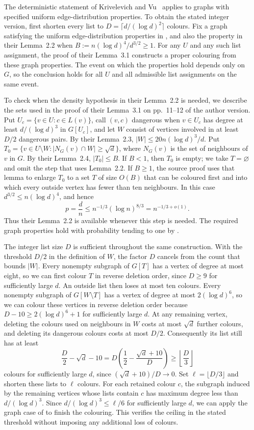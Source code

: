 \documentclass[11pt]{article}
\numberwithin{equation}{section}
\begin{document}
  
The deterministic statement of Krivelevich and Vu~\cite[Lemma~3.1]{KV} applies to graphs with specified uniform edge-distribution properties. To obtain the stated integer version, first shorten every list to $D=\lceil d/(\log d)^2\rceil$ colours. Fix a graph satisfying the uniform edge-distribution properties in \cite[Lemmas~2.1, 2.3 and~2.4]{KV}, and also the property in their Lemma~2.2 when $B:=n(\log d)^4/d^{3/2}\ge1$. For any $U$ and any such list assignment, the proof of their Lemma~3.1 constructs a proper colouring from these graph properties. The event on which the properties hold depends only on $G$, so the conclusion holds for all $U$ and all admissible list assignments on the same event.

To check when the density hypothesis in their Lemma~2.2 is needed, we describe the sets used in the proof of their Lemma~3.1 on pp.~11--12 of the author version. Put $U_c=\{v\in U:c\in L(v)\}$, call $(v,c)$ dangerous when $v\in U_c$ has degree at least $d/(\log d)^3$ in $G[U_c]$, and let $W$ consist of vertices involved in at least $D/2$ dangerous pairs. By their Lemma~2.3, $|W|\le20n(\log d)^3/d$. Put $T_0=\{v\in U\setminus W:|N_G(v)\cap W|\ge\sqrt d\}$, where $N_G(v)$ is the set of neighbours of $v$ in $G$. By their Lemma~2.4, $|T_0|\le B$. If $B<1$, then $T_0$ is empty; we take $T=\varnothing$ and omit the step that uses Lemma~2.2. If $B\ge1$, the source proof uses that lemma to enlarge $T_0$ to a set $T$ of size $O(B)$ that can be coloured first and into which every outside vertex has fewer than ten neighbours. In this case $d^{3/2}\le n(\log d)^4$, and hence
\[
 p=\frac dn\le n^{-1/3}(\log n)^{8/3}=n^{-1/3+o(1)}.
\]
Thus their Lemma~2.2 is available whenever this step is needed. The required graph properties hold with probability tending to one by \cite[Lemmas~2.1--2.4]{KV}.

The integer list size $D$ is sufficient throughout the same construction. With the threshold $D/2$ in the definition of $W$, the factor $D$ cancels from the count that bounds $|W|$. Every nonempty subgraph of $G[T]$ has a vertex of degree at most eight, so we can first colour $T$ in reverse deletion order, since $D\ge9$ for sufficiently large $d$. An outside list then loses at most ten colours. Every nonempty subgraph of $G[W\setminus T]$ has a vertex of degree at most $2(\log d)^6$, so we can colour these vertices in reverse deletion order because $D-10\ge2(\log d)^6+1$ for sufficiently large $d$. At any remaining vertex, deleting the colours used on neighbours in $W$ costs at most $\sqrt d$ further colours, and deleting its dangerous colours costs at most $D/2$. Consequently its list still has at least
\[
 \frac D2-\sqrt d-10
 =D\left(\frac12-\frac{\sqrt d+10}{D}\right)
 \ge\left\lfloor\frac D3\right\rfloor
\]
colours for sufficiently large $d$, since $(\sqrt d+10)/D\to0$. Set $\ell=\lfloor D/3\rfloor$ and shorten these lists to $\ell$ colours. For each retained colour $c$, the subgraph induced by the remaining vertices whose lists contain $c$ has maximum degree less than $d/(\log d)^3$. Since $d/(\log d)^3\le\ell/6$ for sufficiently large $d$, we can apply the graph case of \cite[Lemma~2.7]{KV} to finish the colouring. This verifies the ceiling in the stated threshold without imposing any additional loss of colours.
 
\end{document}
